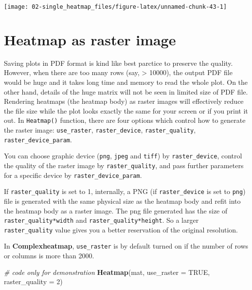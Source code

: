 \documentclass[]{book}
\newenvironment{Shaded}{\begin{snugshade}}{\end{snugshade}}
\newcommand{\KeywordTok}[1]{\textcolor[rgb]{0.13,0.29,0.53}{\textbf{#1}}}
\newcommand{\DataTypeTok}[1]{\textcolor[rgb]{0.13,0.29,0.53}{#1}}
\newcommand{\DecValTok}[1]{\textcolor[rgb]{0.00,0.00,0.81}{#1}}
\newcommand{\CommentTok}[1]{\textcolor[rgb]{0.56,0.35,0.01}{\textit{#1}}}
\newcommand{\OtherTok}[1]{\textcolor[rgb]{0.56,0.35,0.01}{#1}}
\newcommand{\NormalTok}[1]{#1}
\theoremstyle{definition}
\theoremstyle{definition}
\theoremstyle{definition}
\theoremstyle{remark}
\begin{document}
\begin{center}\texttt{[image: 02-single\_heatmap\_files/figure-latex/unnamed-chunk-43-1]} \end{center}

\section{Heatmap as raster image}\label{heatmap-as-raster-image}

Saving plots in PDF format is kind like best parctice to preserve the
quality. However, when there are too many rows (say, \textgreater{}
10000), the output PDF file would be huge and it takes long time and
memory to read the whole plot. On the other hand, details of the huge
matrix will not be seen in limited size of PDF file. Rendering heatmaps
(the heatmap body) as raster images will effectively reduce the file
size while the plot looks exactly the same for your screen or if you
print it out. In \texttt{Heatmap()} function, there are four options
which control how to generate the raster image: \texttt{use\_raster},
\texttt{raster\_device}, \texttt{raster\_quality},
\texttt{raster\_device\_param}.

You can choose graphic device (\texttt{png}, \texttt{jpeg} and
\texttt{tiff}) by \texttt{raster\_device}, control the quality of the
raster image by \texttt{raster\_quality}, and pass further parameters
for a specific device by \texttt{raster\_device\_param}.

If \texttt{raster\_quality} is set to 1, internally, a PNG (if
\texttt{raster\_device} is set to \texttt{png}) file is generated with
the same physical size as the heatmap body and refit into the heatmap
body as a raster image. The png file generated has the size of
\texttt{raster\_quality*width} and \texttt{raster\_quality*height}. So a
larger \texttt{raster\_quality} value gives you a better reservation of
the original resolution.

In \textbf{Complexheatmap}, \texttt{use\_raster} is by default turned on
if the number of rows or columns is more than 2000.

\begin{Shaded}
\begin{Highlighting}[]
\CommentTok{# code only for demonstration}
\KeywordTok{Heatmap}\NormalTok{(mat, }\DataTypeTok{use_raster =} \OtherTok{TRUE}\NormalTok{, }\DataTypeTok{raster_quality =} \DecValTok{2}\NormalTok{)}
\end{Highlighting}
\end{Shaded}
\end{document}
